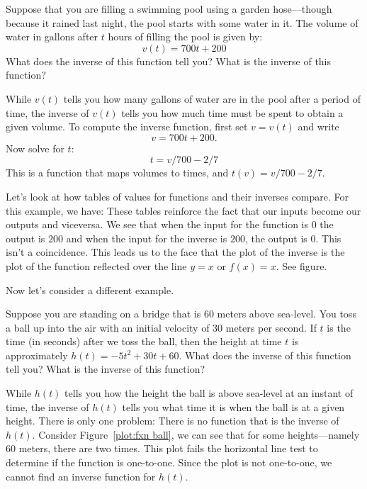 \documentclass{ximera}
\begin{document}
\begin{image}
\begin{image}
\begin{example}
Suppose that you are filling a swimming pool using a garden
hose---though because it rained last night, the pool starts with some
water in it. The volume of water in gallons after $t$ hours of
filling the pool is given by:
\[
v(t) = 700t + 200
\]
What does the inverse of this function tell you? What is the inverse
of this function?
\end{example}

\begin{solution}
While $v(t)$ tells you how many gallons of water are in the pool after
a period of time, the inverse of $v(t)$ tells you how much time must
be spent to obtain a given volume. To compute the inverse function,
first set $v=v(t)$ and write
\[
v = 700t + 200.
\]
Now solve for $t$:
\[
t = v/700 - 2/7
\]
This is a function that maps volumes to times, and 
$t(v) = v/700-2/7$.

Let's look at how tables of values for functions and their inverses compare.  For this example, we have: 
These tables reinforce the fact that our inputs become our outputs and viceversa.  We see that when the input for the function is $0$ the output is $200$ and when the input for the inverse is $200$, the output is $0$.  This isn't a coincidence.  This leads us to the face that the plot of the inverse is the plot of the function reflected over the line $y=x$ or $f(x)=x$.  See figure.
\end{solution}


Now let's consider a different example.

\begin{example}\label{E:example-ball-bridge}
Suppose you are standing on a bridge that is 60 meters above
sea-level. You toss a ball up into the air with an initial velocity of
30 meters per second.  If $t$ is the time (in seconds) after we toss
the ball, then the height at time $t$ is approximately $h(t) = -5 t^2
+30t+60$. What does the inverse of this function tell you? What is the inverse
of this function?
\end{example}


\begin{solution}
While $h(t)$ tells you how the height the ball is above sea-level at an
instant of time, the inverse of $h(t)$ tells you what time it is when
the ball is at a given height. There is only one problem: There is no
function that is the inverse of $h(t)$. Consider Figure~\ref{plot:fxn
  ball}, we can see that for some heights---namely 60 meters, there
are two times. This plot fails the horizontal line test to determine if the function is one-to-one.  Since the plot is not one-to-one, we cannot find an inverse function for $h(t)$.


\end{solution}
\end{image}
\end{image}
\end{document}
